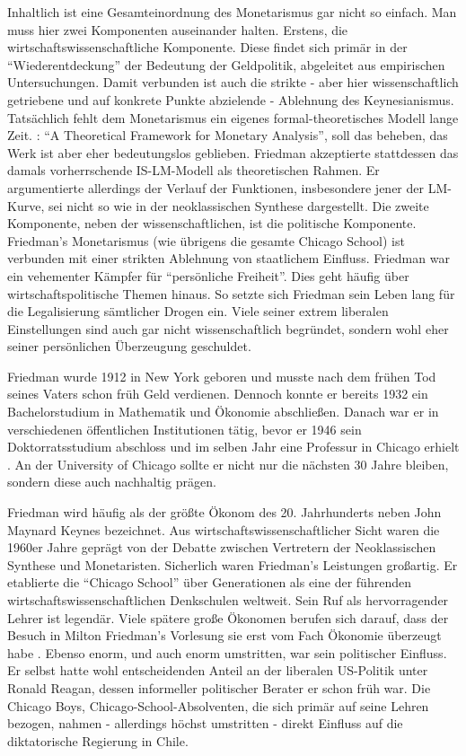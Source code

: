 Inhaltlich ist eine Gesamteinordnung des Monetarismus gar nicht so einfach. Man muss hier zwei Komponenten auseinander halten. Erstens, die wirtschaftswissenschaftliche Komponente. Diese findet sich primär in der "`Wiederentdeckung"' der Bedeutung der Geldpolitik, abgeleitet aus empirischen Untersuchungen. Damit verbunden ist auch die strikte - aber hier wissenschaftlich getriebene und auf konkrete Punkte abzielende - Ablehnung des Keynesianismus. Tatsächlich fehlt dem Monetarismus ein eigenes formal-theoretisches Modell lange Zeit. \textcite{Friedman1970}: "`A Theoretical Framework for Monetary Analysis"', soll das beheben, das Werk ist aber eher bedeutungslos geblieben. Friedman akzeptierte stattdessen das damals vorherrschende IS-LM-Modell als theoretischen Rahmen. Er argumentierte allerdings der Verlauf der Funktionen, insbesondere jener der LM-Kurve, sei nicht so wie in der neoklassischen Synthese dargestellt.
Die zweite Komponente, neben der wissenschaftlichen, ist die politische Komponente. Friedman's Monetarismus (wie übrigens die gesamte Chicago School) ist verbunden mit einer strikten Ablehnung von staatlichem Einfluss. Friedman war ein vehementer Kämpfer für "`persönliche Freiheit"'. Dies geht häufig über wirtschaftspolitische Themen hinaus. So setzte sich Friedman sein Leben lang für die Legalisierung sämtlicher Drogen ein. Viele seiner extrem liberalen Einstellungen sind auch gar nicht wissenschaftlich begründet, sondern wohl eher seiner persönlichen Überzeugung geschuldet. 

Friedman wurde 1912 in New York geboren und musste nach dem frühen Tod seines Vaters schon früh Geld verdienen. Dennoch konnte er bereits 1932 ein Bachelorstudium in Mathematik und Ökonomie abschließen. Danach war er in verschiedenen öffentlichen Institutionen tätig, bevor er 1946 sein Doktorratsstudium abschloss und im selben Jahr eine Professur in Chicago erhielt \parencite[S. 204]{Linss2017}. An der University of Chicago sollte er nicht nur die nächsten 30 Jahre bleiben, sondern diese auch nachhaltig prägen.

Friedman wird häufig als der größte Ökonom des 20. Jahrhunderts neben John Maynard Keynes bezeichnet. Aus wirtschaftswissenschaftlicher Sicht waren die 1960er Jahre geprägt von der Debatte zwischen Vertretern der Neoklassischen Synthese und Monetaristen. Sicherlich waren Friedman's Leistungen großartig. Er etablierte die "`Chicago School"' über Generationen als eine der führenden wirtschaftswissenschaftlichen Denkschulen weltweit. Sein Ruf als hervorragender Lehrer ist legendär. Viele spätere große Ökonomen berufen sich darauf, dass der Besuch in Milton Friedman's Vorlesung sie erst vom Fach Ökonomie überzeugt habe \parencite[S. 165]{Snowdon2005}. Ebenso enorm, und auch enorm umstritten, war sein politischer Einfluss. Er selbst hatte wohl entscheidenden Anteil an der liberalen US-Politik unter Ronald Reagan, dessen informeller politischer Berater er schon früh war. Die Chicago Boys, Chicago-School-Absolventen, die sich primär auf seine Lehren bezogen, nahmen - allerdings höchst umstritten - direkt Einfluss auf die diktatorische Regierung in Chile.

